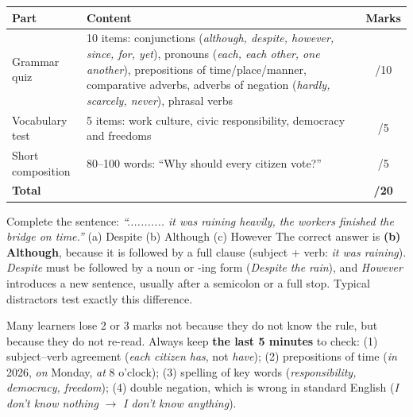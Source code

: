 \documentclass[11pt]{article}
\begin{document}
\begin{exemplebox}
\begin{center}
\begin{tabularx}{\linewidth}{|l|X|c|}
\hline
\rowcolor{popblueL} \textbf{Part} & \textbf{Content} & \textbf{Marks} \\
\hline
Grammar quiz & 10 items: conjunctions (\emph{although, despite, however, since, for, yet}), pronouns (\emph{each, each other, one another}), prepositions of time/place/manner, comparative adverbs, adverbs of negation (\emph{hardly, scarcely, never}), phrasal verbs & /10 \\
\hline
Vocabulary test & 5 items: work culture, civic responsibility, democracy and freedoms & /5 \\
\hline
Short composition & 80--100 words: ``Why should every citizen vote?'' & /5 \\
\hline
\textbf{Total} & & \textbf{/20} \\
\hline
\end{tabularx}
\end{center}
\end{exemplebox}

\begin{exoresolu}
Complete the sentence: \emph{``........... it was raining heavily, the workers finished the bridge on time.''} (a) Despite \quad (b) Although \quad (c) However
\tcblower
The correct answer is \textbf{(b) Although}, because it is followed by a full clause (subject + verb: \emph{it was raining}). \emph{Despite} must be followed by a noun or -ing form (\emph{Despite the rain}), and \emph{However} introduces a new sentence, usually after a semicolon or a full stop. Typical distractors test exactly this difference.
\end{exoresolu}

\begin{attention}
Many learners lose 2 or 3 marks not because they do not know the rule, but because they do not re-read. Always keep \textbf{the last 5 minutes} to check: (1) subject--verb agreement (\emph{each citizen has}, not \emph{have}); (2) prepositions of time (\emph{in} 2026, \emph{on} Monday, \emph{at} 8 o'clock); (3) spelling of key words (\emph{responsibility, democracy, freedom}); (4) double negation, which is wrong in standard English (\emph{I don't know nothing} $\rightarrow$ \emph{I don't know anything}).
\end{attention}
\end{document}
